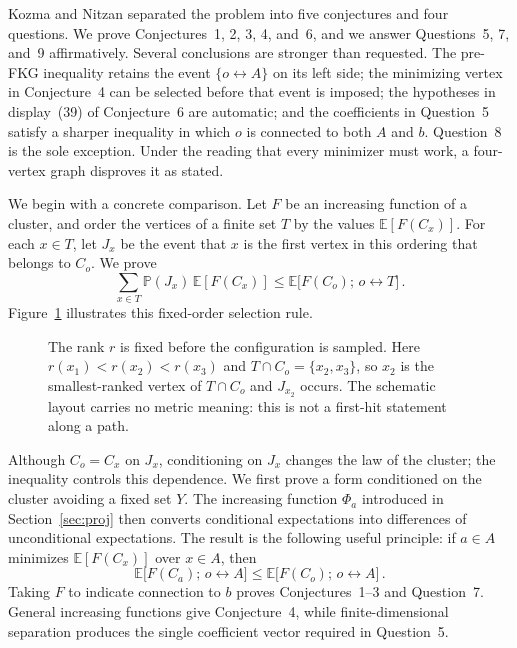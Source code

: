 \documentclass[11pt]{article}
\theoremstyle{definition}
\theoremstyle{remark}
\newcommand{\PP}{\mathbb P}
\newcommand{\EE}{\mathbb E}
\newcommand{\con}{\leftrightarrow}
\begin{document}
Kozma and Nitzan separated the problem into five conjectures and four questions. We prove
Conjectures~1, 2, 3, 4, and~6, and we answer Questions~5, 7, and~9 affirmatively. Several
conclusions are stronger than requested. The pre-FKG inequality retains the event
$\{o\con A\}$ on its left side; the minimizing vertex in Conjecture~4 can be selected
before that event is imposed; the hypotheses in display~(39) of Conjecture~6 are
automatic; and the coefficients in Question~5 satisfy a sharper inequality in which $o$
is connected to both $A$ and $b$. Question~8 is the sole exception. Under the reading
that every minimizer must work, a four-vertex graph disproves it as stated.

We begin with a concrete comparison. Let $F$ be an increasing function of a cluster, and
order the vertices of a finite set $T$ by the values $\EE[F(C_x)]$. For each $x\in T$, let
$J_x$ be the event that $x$ is the first vertex in this ordering that belongs to $C_o$.
We prove
\[
  \sum_{x\in T}\PP(J_x)\,\EE[F(C_x)]
  \leq \EE\bigl[F(C_o);\,o\con T\bigr] \,.
\]
Figure~\ref{fig:first-vertex} illustrates this fixed-order selection rule.
\begin{figure}[htbp]
\centering
{}
\caption{The rank $r$ is fixed before the configuration is sampled. Here
$r(x_1)<r(x_2)<r(x_3)$ and $T\cap C_o=\{x_2,x_3\}$, so $x_2$ is the
smallest-ranked vertex of $T\cap C_o$ and $J_{x_2}$ occurs. The schematic layout carries
no metric meaning: this is not a first-hit statement along a path.}
\label{fig:first-vertex}
\end{figure}
Although $C_o=C_x$ on $J_x$, conditioning on $J_x$ changes the law of the cluster; the
inequality controls this dependence. We first prove a form conditioned on the cluster
avoiding a fixed set $Y$. The increasing function $\Phi_a$ introduced in
Section~\ref{sec:proj} then converts conditional expectations into differences of
unconditional expectations. The
result is the following useful principle: if $a\in A$ minimizes $\EE[F(C_x)]$ over
$x\in A$, then
\[
  \EE\bigl[F(C_a);\,o\con A\bigr]
  \leq \EE\bigl[F(C_o);\,o\con A\bigr] \,.
\]
Taking $F$ to indicate connection to $b$ proves Conjectures~1--3 and Question~7. General
increasing functions give Conjecture~4, while finite-dimensional separation produces the
single coefficient vector required in Question~5.
\end{document}
